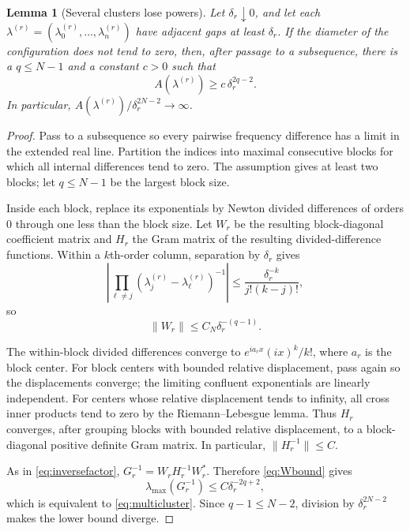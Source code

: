 \documentclass[11pt]{article}
\newtheorem{lemma}{Lemma}
\begin{document}
\begin{lemma}[Several clusters lose powers]\label{lem:multicluster}
Let $\delta_r\downarrow0$, and let each $\lambda^{(r)}=(\lambda_0^{(r)},\ldots,\lambda_n^{(r)})$ have adjacent gaps at least $\delta_r$.  If the diameter of the configuration does not tend to zero, then, after passage to a subsequence, there is a $q\leq N-1$ and a constant $c>0$ such that
\begin{equation}\label{eq:multicluster}
 A(\lambda^{(r)})\geq c\,\delta_r^{2q-2}.
\end{equation}
In particular, $A(\lambda^{(r)})/\delta_r^{2N-2}\to\infty$.
\end{lemma}

\begin{proof}
Pass to a subsequence so every pairwise frequency difference has a limit in the extended real line.  Partition the indices into maximal consecutive blocks for which all internal differences tend to zero.  The assumption gives at least two blocks; let $q\leq N-1$ be the largest block size.

Inside each block, replace its exponentials by Newton divided differences of orders $0$ through one less than the block size.  Let $W_r$ be the resulting block-diagonal coefficient matrix and $H_r$ the Gram matrix of the resulting divided-difference functions.  Within a $k$th-order column, separation by $\delta_r$ gives
\[
 \left|\prod_{\ell\ne j}(\lambda_j^{(r)}-\lambda_\ell^{(r)})^{-1}\right|
 \leq \frac{\delta_r^{-k}}{j!(k-j)!},
\]
so
\begin{equation}\label{eq:Wbound}
 \|W_r\|\leq C_N\delta_r^{-(q-1)}.
\end{equation}

The within-block divided differences converge to
$e^{ia_rx}(ix)^k/k!$, where $a_r$ is the block center.  For block centers with bounded relative displacement, pass again so the displacements converge; the limiting confluent exponentials are linearly independent.  For centers whose relative displacement tends to infinity, all cross inner products tend to zero by the Riemann--Lebesgue lemma.  Thus $H_r$ converges, after grouping blocks with bounded relative displacement, to a block-diagonal positive definite Gram matrix.  In particular, $\|H_r^{-1}\|\leq C$.

As in \eqref{eq:inversefactor}, $G_r^{-1}=W_rH_r^{-1}W_r^*$.  Therefore \eqref{eq:Wbound} gives
\[
 \lambda_{\max}(G_r^{-1})\leq C\delta_r^{-2q+2},
\]
which is equivalent to \eqref{eq:multicluster}.  Since $q-1\leq N-2$, division by $\delta_r^{2N-2}$ makes the lower bound diverge.
\end{proof}
\end{document}
